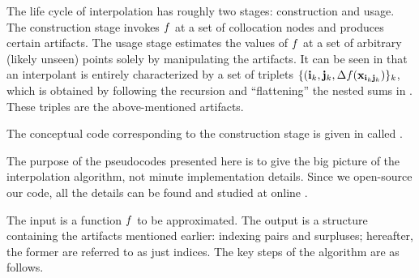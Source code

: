 The life cycle of interpolation has roughly two stages: construction and usage.
The construction stage invokes $f$ at a set of collocation nodes and produces
certain artifacts. The usage stage estimates the values of $f$ at a set of
arbitrary (likely unseen) points solely by manipulating the artifacts. It can be
seen in  that an interpolant is entirely characterized by a
set of triplets $\{ (\mathbf{i}_k, \mathbf{j}_k, \Delta f(\mathbf{x}_{\mathbf{i}_k \mathbf{j}_k}) \}_k$, which is
obtained by following the recursion and ``flattening'' the nested sums in
. These triples are the above-mentioned artifacts.


The conceptual code corresponding to the construction stage is given in
 called .

\begin{remark}
The purpose of the pseudocodes presented here is to give the big picture of the
interpolation algorithm, not minute implementation details. Since we open-source
our code, all the details can be found and studied at online \cite{sources}.
\end{remark}

The input  is a function $f$ to be approximated. The output
 is a structure containing the artifacts mentioned earlier:
indexing pairs and surpluses; hereafter, the former are referred to as just
indices. The key steps of the  algorithm are as follows.


